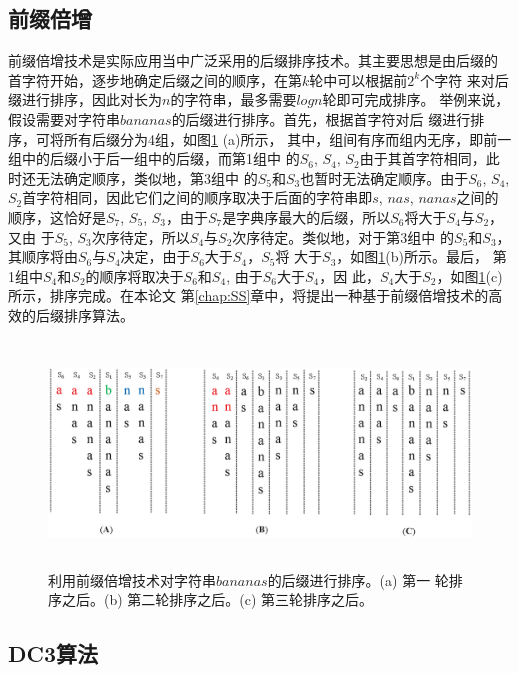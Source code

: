 \subsection{前缀倍增}

前缀倍增技术是实际应用当中广泛采用的后缀排序技术。其主要思想是由后缀的
首字符开始，逐步地确定后缀之间的顺序，在第$k$轮中可以根据前$2^k$个字符
来对后缀进行排序，因此对长为$n$的字符串，最多需要$logn$轮即可完成排序。
举例来说，假设需要对字符串$bananas$的后缀进行排序。首先，根据首字符对后
缀进行排序，可将所有后缀分为4组，如图\ref{fig:Prefix_Doubling} (a)所示，
其中，组间有序而组内无序，即前一组中的后缀小于后一组中的后缀，而第1组中
的$S_6$, $S_4$,
$S_2$由于其首字符相同，此时还无法确定顺序，类似地，第3组中
的$S_5$和$S_3$也暂时无法确定顺序。由于$S_6$, $S_4$,
$S_2$首字符相同，因此它们之间的顺序取决于后面的字符串即$s$, $nas$,
$nanas$之间的顺序，这恰好是$S_7$, $S_5$,
$S_3$，由于$S_7$是字典序最大的后缀，所以$S_6$将大于$S_4$与$S_2$，又由
于$S_5$,
$S_3$次序待定，所以$S_4$与$S_2$次序待定。类似地，对于第3组中
的$S_5$和$S_3$，其顺序将由$S_6$与$S_4$决定，由于$S_6$大于$S_4$，$S_5$将
大于$S_3$，如图\ref{fig:Prefix_Doubling}(b)所示。最后，
第1组中$S_4$和$S_2$的顺序将取决于$S_6$和$S_4$, 由于$S_6$大于$S_4$，因
此，$S_4
$大于$S_2$，如图\ref{fig:Prefix_Doubling}(c)所示，排序完成。在本论文
第\ref{chap:SS}章中，将提出一种基于前缀倍增技术的高效的后缀排序算法。

\begin{figure}[H]
  \centering
  \includegraphics[height=6cm ,width=15cm]{figures/1_Introduction/Prefix_Doubling.eps}
  \caption{利用前缀倍增技术对字符串$bananas$的后缀进行排序。(a) 第一
    轮排序之后。(b) 第二轮排序之后。(c) 第三轮排序之后。}
  \label{fig:Prefix_Doubling}
\end{figure}

\subsection{DC3算法}
\label{sec:KA}

